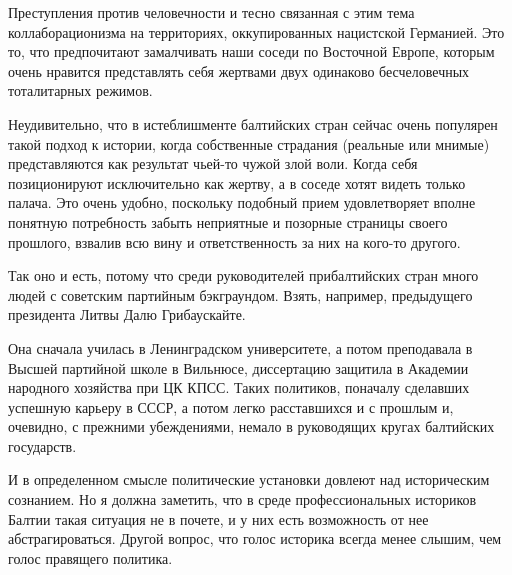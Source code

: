 
Преступления против человечности и тесно связанная с этим тема
коллаборационизма на территориях, оккупированных нацистской Германией. Это то,
что предпочитают замалчивать наши соседи по Восточной Европе, которым очень
нравится представлять себя жертвами двух одинаково бесчеловечных тоталитарных
режимов.

Неудивительно, что в истеблишменте балтийских стран сейчас очень популярен
такой подход к истории, когда собственные страдания (реальные или мнимые)
представляются как результат чьей-то чужой злой воли. Когда себя позиционируют
исключительно как жертву, а в соседе хотят видеть только палача. Это очень
удобно, поскольку подобный прием удовлетворяет вполне понятную потребность
забыть неприятные и позорные страницы своего прошлого, взвалив всю вину и
ответственность за них на кого-то другого.


Так оно и есть, потому что среди руководителей прибалтийских стран много людей
с советским партийным бэкграундом. Взять, например, предыдущего президента
Литвы Далю Грибаускайте.

Она сначала училась в Ленинградском университете, а потом преподавала в Высшей
партийной школе в Вильнюсе, диссертацию защитила в Академии народного хозяйства
при ЦК КПСС. Таких политиков, поначалу сделавших успешную карьеру в СССР, а
потом легко расставшихся и с прошлым и, очевидно, с прежними убеждениями,
немало в руководящих кругах балтийских государств.

И в определенном смысле политические установки довлеют над историческим
сознанием. Но я должна заметить, что в среде профессиональных историков Балтии
такая ситуация не в почете, и у них есть возможность от нее абстрагироваться.
Другой вопрос, что голос историка всегда менее слышим, чем голос правящего
политика.
